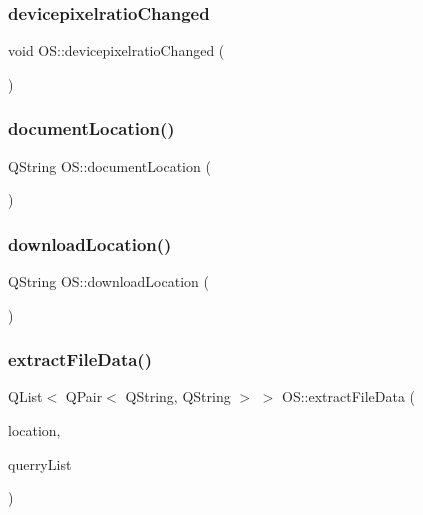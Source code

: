 \mbox{\label{classOS_a0ecbe56e6ec612ba6f78af5086505751}} 
\subsubsection{\texorpdfstring{devicepixelratio\+Changed}{devicepixelratioChanged}}
{\footnotesize\ttfamily void O\+S\+::devicepixelratio\+Changed (\begin{DoxyParamCaption}{ }\end{DoxyParamCaption})\hspace{0.3cm}{\ttfamily [signal]}}

\mbox{\label{classOS_a88ba12fba1acd2557506942e0099634b}} 
\subsubsection{\texorpdfstring{document\+Location()}{documentLocation()}}
{\footnotesize\ttfamily Q\+String O\+S\+::document\+Location (\begin{DoxyParamCaption}{ }\end{DoxyParamCaption})}

\mbox{\label{classOS_a0dac0a86aca0d89d27b9596999506713}} 
\subsubsection{\texorpdfstring{download\+Location()}{downloadLocation()}}
{\footnotesize\ttfamily Q\+String O\+S\+::download\+Location (\begin{DoxyParamCaption}{ }\end{DoxyParamCaption})}

\mbox{\label{classOS_a5703fdddfbee21d53e71906d509df442}} 
\subsubsection{\texorpdfstring{extract\+File\+Data()}{extractFileData()}}
{\footnotesize\ttfamily Q\+List$<$ Q\+Pair$<$ Q\+String, Q\+String $>$ $>$ O\+S\+::extract\+File\+Data (\begin{DoxyParamCaption}\item[{Q\+String}]{location,  }\item[{Q\+String\+List}]{querry\+List }\end{DoxyParamCaption})\hspace{0.3cm}{\ttfamily [private]}}

